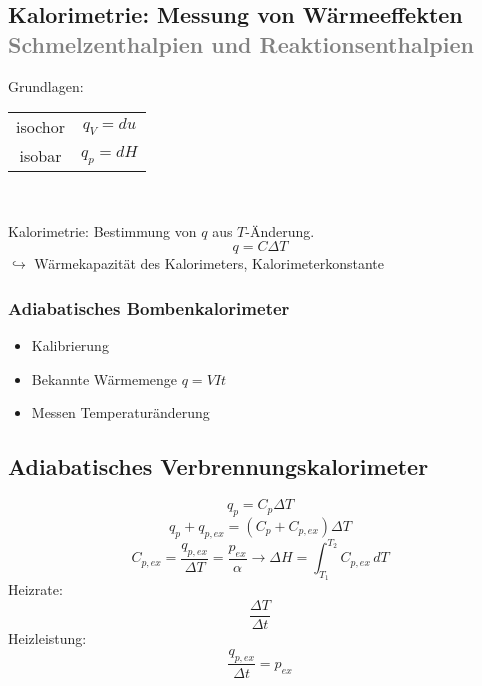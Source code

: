 \documentclass[a4paper, fleqn]{article}
\begin{document}
\subsection{Kalorimetrie: Messung von Wärmeeffekten \textcolor{gray}{Schmelzenthalpien und Reaktionsenthalpien}}
Grundlagen:\\
\begin{center}
    \begin{tabular}{c c}
        \hline
        isochor & $q_V = du$\\
        isobar & $q_p = dH$\\
        \hline
    \end{tabular}\\
\end{center}
Kalorimetrie: Bestimmung von $q$ aus $T$-Änderung.\\
\begin{equation*}
    q = C\Delta T
\end{equation*}
$\hookrightarrow$ Wärmekapazität des Kalorimeters, Kalorimeterkonstante\\

\subsubsection{Adiabatisches Bombenkalorimeter}
\begin{itemize}
    \item Kalibrierung
    \item Bekannte Wärmemenge $q = VIt$
    \item Messen Temperaturänderung
\end{itemize}

\subsection{Adiabatisches Verbrennungskalorimeter}
\begin{equation*}
    q_p = C_p \Delta T
\end{equation*}
\begin{equation*}
    q_p + q_{p,ex} = (C_p + C_{p,ex}) \Delta T
\end{equation*}
\begin{equation*}
    C_{p,ex} = \frac{q_{p,ex}}{\Delta T} = \frac{p_{ex}}{\alpha} \rightarrow \Delta H = \int_{T_1}^{T_2} C_{p,ex} \, dT
\end{equation*}
Heizrate:
\begin{equation*}
    \frac{\Delta T}{\Delta t}
\end{equation*}
Heizleistung:
\begin{equation*}
    \frac{q_{p,ex}}{\Delta t} = p_{ex}
\end{equation*}
\end{document}
